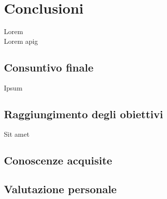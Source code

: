 
\chapter{Conclusioni}
\label{cap:conclusioni}

Lorem 
\\
Lorem \gls{apig}

\section{Consuntivo finale}

Ipsum

\section{Raggiungimento degli obiettivi}

Sit amet


\section{Conoscenze acquisite}

\section{Valutazione personale}

